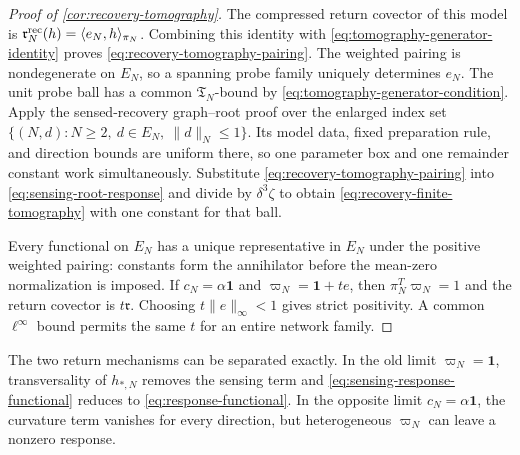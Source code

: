 \begin{proof}[Proof of \cref{cor:recovery-tomography}]
The compressed return covector of this model is
\(\mathfrak r_N^{\rm rec}(h)=\langle e_N,h\rangle_{\pi_N}\).
Combining this identity with
\cref{eq:tomography-generator-identity} proves
\cref{eq:recovery-tomography-pairing}.  The weighted pairing is
nondegenerate on \(E_N\), so a spanning probe family uniquely determines
\(e_N\).  The unit probe ball has a common \(\mathfrak T_N\)-bound by
\cref{eq:tomography-generator-condition}.  Apply the sensed-recovery
graph--root proof over the enlarged index set
\(\{(N,d):N\ge2,\ d\in E_N,\ \|d\|_N\le1\}\).  Its model data, fixed
preparation rule, and direction bounds are uniform there, so one parameter
box and one remainder constant work simultaneously.  Substitute
\cref{eq:recovery-tomography-pairing} into
\cref{eq:sensing-root-response} and divide by \(\delta^3\zeta\) to obtain
\cref{eq:recovery-finite-tomography} with one constant for that ball.

Every functional on \(E_N\) has a unique representative in \(E_N\) under
the positive weighted pairing: constants form the annihilator before the
mean-zero normalization is imposed.  If \(c_N=\alpha\mathbf1\) and
\(\varpi_N=\mathbf1+t e\), then
\(\pi_N^T\varpi_N=1\) and the return covector is \(t\mathfrak r\).
Choosing \(t\|e\|_\infty<1\) gives strict positivity.  A common
\(\ell^\infty\) bound permits the same \(t\) for an entire network family.
\end{proof}

The two return mechanisms can be separated exactly.  In the old limit
\(\varpi_N=\mathbf1\), transversality of \(h_{*,N}\) removes the sensing
term and \cref{eq:sensing-response-functional} reduces to
\cref{eq:response-functional}.  In the opposite limit
\(c_N=\alpha\mathbf1\), the curvature term vanishes for every direction,
but heterogeneous \(\varpi_N\) can leave a nonzero response.

